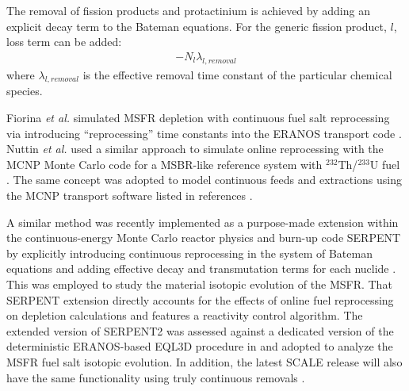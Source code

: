 The removal of fission products and protactinium is achieved by adding an explicit decay term to the Bateman equations. For the generic fission product, $l$, loss term can be added:
\begin{align} 
- N_{l}\lambda_{l,removal}  \label{eq:rem_term}
\end{align}
where $\lambda_{l,removal}$ is the effective removal time constant of the particular chemical species. 

Fiorina \emph{et al.} simulated \gls{MSFR} depletion with continuous fuel 
salt reprocessing via introducing 
``reprocessing'' time constants into the ERANOS transport code 
\cite{fiorina_investigation_2013}. Nuttin \emph{et al.} used a similar approach 
to simulate online reprocessing with the MCNP Monte Carlo code for a 
\gls{MSBR}-like reference 
system with $^{232}$Th/$^{233}$U fuel \cite{nuttin_potential_2005}.
The same concept was adopted to model continuous feeds and extractions 
using the 
MCNP transport software listed in references \cite{doligez_coupled_2014,
heuer_towards_2014}. 

A similar method was recently implemented as a purpose-made extension within 
the continuous-energy Monte Carlo reactor physics and burn-up code 
SERPENT by explicitly introducing 
continuous reprocessing in the system of Bateman equations and adding 
effective decay and transmutation terms for each nuclide 
\cite{aufiero_extended_2013}. This was employed to study the material 
isotopic evolution of the \gls{MSFR}\cite{aufiero_extended_2013}. 
That SERPENT extension \cite{aufiero_extended_2013} directly 
accounts for the effects of online fuel reprocessing on depletion calculations 
and features a reactivity control 
algorithm. The extended version of SERPENT2 was assessed against a dedicated 
version of the deterministic ERANOS-based EQL3D procedure in
\cite{ruggieri_eranos_2006, fiorina_investigation_2013} and adopted to analyze 
the \gls{MSFR} fuel salt isotopic evolution. In addition, the latest SCALE release 
will also have the same functionality using truly continuous removals \cite{betzler_implementation_2017}. 

